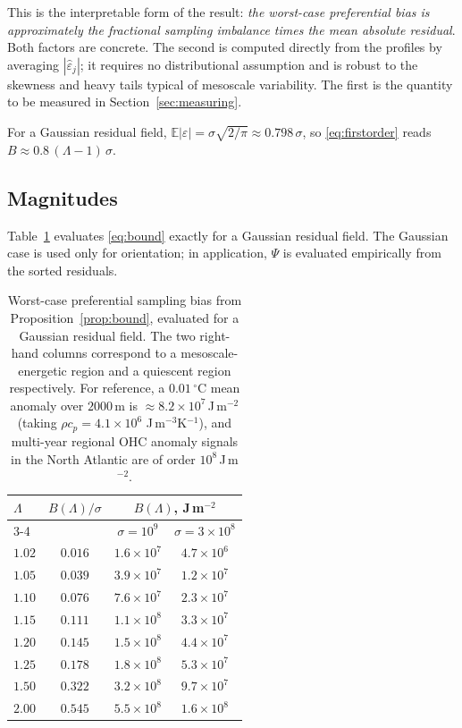 This is the interpretable form of the result: \emph{the worst-case preferential bias is
approximately the fractional sampling imbalance times the mean absolute residual}. Both
factors are concrete. The second is computed directly from the profiles by averaging
$|\hat\varepsilon_j|$; it requires no distributional assumption and is robust to the skewness
and heavy tails typical of mesoscale variability. The first is the quantity to be measured in
Section~\ref{sec:measuring}.

For a Gaussian residual field, $\mathbb{E}|\varepsilon| = \sigma\sqrt{2/\pi} \approx
0.798\,\sigma$, so \eqref{eq:firstorder} reads $B \approx 0.8\,(\Lambda-1)\,\sigma$.

\subsection{Magnitudes}
\label{sec:magnitudes}

Table~\ref{tab:lambda} evaluates \eqref{eq:bound} exactly for a Gaussian residual field. The
Gaussian case is used only for orientation; in application, $\Psi$ is evaluated empirically
from the sorted residuals.

\begin{table}[t]
\centering
\begin{tabular}{lccc}
\toprule
$\Lambda$ & $B(\Lambda)/\sigma$ & \multicolumn{2}{c}{$B(\Lambda)$, J\,m$^{-2}$} \\
\cmidrule(lr){3-4}
 & & $\sigma = 10^{9}$ & $\sigma = 3\times10^{8}$ \\
\midrule
$1.02$ & $0.016$ & $1.6\times10^{7}$ & $4.7\times10^{6}$ \\
$1.05$ & $0.039$ & $3.9\times10^{7}$ & $1.2\times10^{7}$ \\
$1.10$ & $0.076$ & $7.6\times10^{7}$ & $2.3\times10^{7}$ \\
$1.15$ & $0.111$ & $1.1\times10^{8}$ & $3.3\times10^{7}$ \\
$1.20$ & $0.145$ & $1.5\times10^{8}$ & $4.4\times10^{7}$ \\
$1.25$ & $0.178$ & $1.8\times10^{8}$ & $5.3\times10^{7}$ \\
$1.50$ & $0.322$ & $3.2\times10^{8}$ & $9.7\times10^{7}$ \\
$2.00$ & $0.545$ & $5.5\times10^{8}$ & $1.6\times10^{8}$ \\
\bottomrule
\end{tabular}
\caption{Worst-case preferential sampling bias from Proposition~\ref{prop:bound}, evaluated
for a Gaussian residual field. The two right-hand columns correspond to a mesoscale-energetic
region and a quiescent region respectively. For reference, a $0.01\,^\circ$C mean anomaly over
$2000$\,m is $\approx 8.2\times10^{7}$\,J\,m$^{-2}$ (taking $\rho c_p = 4.1\times10^{6}$
J\,m$^{-3}$K$^{-1}$), and multi-year regional OHC anomaly signals in the North Atlantic are of
order $10^{8}$\,J\,m$^{-2}$.}
\label{tab:lambda}
\end{table}

